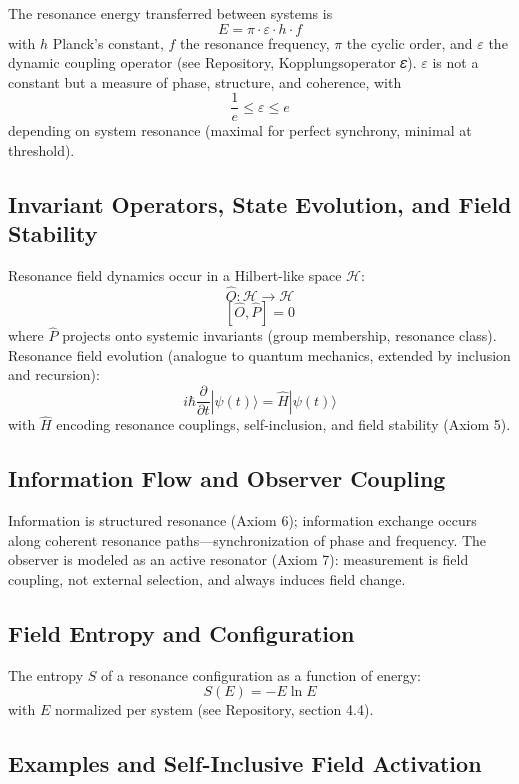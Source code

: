 \documentclass[12pt]{article}
\begin{document}
	The resonance energy transferred between systems is
	\[
	E = \pi \cdot \varepsilon \cdot h \cdot f
	\]
	with $h$ Planck's constant, $f$ the resonance frequency, $\pi$ the cyclic order, and $\varepsilon$ the dynamic coupling operator (see Repository, Kopplungsoperator 𝜀). $\varepsilon$ is not a constant but a measure of phase, structure, and coherence, with
	\[
	\frac{1}{e} \leq \varepsilon \leq e
	\]
	depending on system resonance (maximal for perfect synchrony, minimal at threshold).
	
	\subsection{Invariant Operators, State Evolution, and Field Stability}
	
	Resonance field dynamics occur in a Hilbert-like space $\mathcal{H}$:
	\[
	\hat{O} : \mathcal{H} \to \mathcal{H}
	\]
	\[
	[\hat{O}, \hat{P}] = 0
	\]
	where $\hat{P}$ projects onto systemic invariants (group membership, resonance class). Resonance field evolution (analogue to quantum mechanics, extended by inclusion and recursion):
	\[
	i\hbar \frac{\partial}{\partial t} |\psi(t)\rangle = \hat{H} |\psi(t)\rangle
	\]
	with $\hat{H}$ encoding resonance couplings, self-inclusion, and field stability (Axiom 5).
	
	\subsection{Information Flow and Observer Coupling}
	
	Information is structured resonance (Axiom 6); information exchange occurs along coherent resonance paths—synchronization of phase and frequency. The observer is modeled as an active resonator (Axiom 7): measurement is field coupling, not external selection, and always induces field change.

	\subsection{Field Entropy and Configuration}
	
	The entropy $S$ of a resonance configuration as a function of energy:
	\[
	S(E) = -E \ln E
	\]
	with $E$ normalized per system (see Repository, section 4.4).
	
	\subsection{Examples and Self-Inclusive Field Activation}
	
\end{document}
